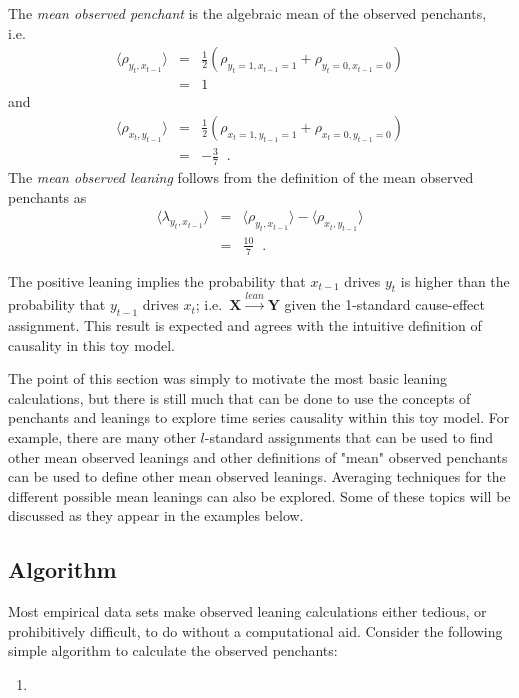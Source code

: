 \documentclass[a4paper,11pt,twocolumn]{article}
\begin{document}
The {\em mean observed penchant} is the algebraic mean of the observed penchants, i.e.\
\begin{eqnarray*}
\langle \rho_{y_t,x_{t-1}} \rangle &=& \frac{1}{2}\left(\rho_{y_t=1,x_{t-1}=1} + \rho_{y_t=0,x_{t-1}=0}\right)\\
&=& 1
\end{eqnarray*}
and
\begin{eqnarray*}
\langle \rho_{x_t,y_{t-1}} \rangle &=& \frac{1}{2}\left(\rho_{x_t=1,y_{t-1}=1} + \rho_{x_t=0,y_{t-1}=0}\right)\\
&=& -\frac{3}{7}\;\;.
\end{eqnarray*}
The {\em mean observed leaning} follows from the definition of the mean observed penchants as
\begin{eqnarray}
\langle \lambda_{y_t,x_{t-1}} \rangle &=& \langle \rho_{y_t,x_{t-1}} \rangle - \langle \rho_{x_t,y_{t-1}} \rangle\\
&=& \frac{10}{7}\;\;.
\end{eqnarray}

The positive leaning implies the probability that $x_{t-1}$ drives $y_t$ is higher than the probability that $y_{t-1}$ drives $x_{t}$; i.e.\ $\mathbf{X}\xrightarrow{lean}\mathbf{Y}$ given the 1-standard cause-effect assignment.  This result is expected and agrees with the intuitive definition of causality in this toy model.  

The point of this section was simply to motivate the most basic leaning calculations, but there is still much that can be done to use the concepts of penchants and leanings to explore time series causality within this toy model.  For example, there are many other $l$-standard assignments that can be used to find other mean observed leanings and other definitions of "mean" observed penchants can be used to define other mean observed leanings.  Averaging techniques for the different possible mean leanings can also be explored.  Some of these topics will be discussed as they appear in the examples below. 

\subsection{Algorithm}
Most empirical data sets make observed leaning calculations either tedious, or prohibitively difficult, to do without a computational aid.  Consider the following simple algorithm to calculate the observed penchants:
\begin{enumerate}
\item 
\end{enumerate}
\end{document}
